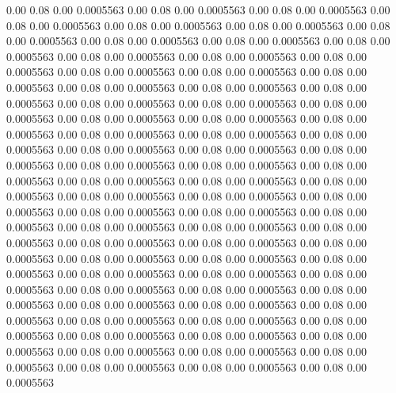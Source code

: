    0.00    0.08    0.00   0.0005563
   0.00    0.08    0.00   0.0005563
   0.00    0.08    0.00   0.0005563
   0.00    0.08    0.00   0.0005563
   0.00    0.08    0.00   0.0005563
   0.00    0.08    0.00   0.0005563
   0.00    0.08    0.00   0.0005563
   0.00    0.08    0.00   0.0005563
   0.00    0.08    0.00   0.0005563
   0.00    0.08    0.00   0.0005563
   0.00    0.08    0.00   0.0005563
   0.00    0.08    0.00   0.0005563
   0.00    0.08    0.00   0.0005563
   0.00    0.08    0.00   0.0005563
   0.00    0.08    0.00   0.0005563
   0.00    0.08    0.00   0.0005563
   0.00    0.08    0.00   0.0005563
   0.00    0.08    0.00   0.0005563
   0.00    0.08    0.00   0.0005563
   0.00    0.08    0.00   0.0005563
   0.00    0.08    0.00   0.0005563
   0.00    0.08    0.00   0.0005563
   0.00    0.08    0.00   0.0005563
   0.00    0.08    0.00   0.0005563
   0.00    0.08    0.00   0.0005563
   0.00    0.08    0.00   0.0005563
   0.00    0.08    0.00   0.0005563
   0.00    0.08    0.00   0.0005563
   0.00    0.08    0.00   0.0005563
   0.00    0.08    0.00   0.0005563
   0.00    0.08    0.00   0.0005563
   0.00    0.08    0.00   0.0005563
   0.00    0.08    0.00   0.0005563
   0.00    0.08    0.00   0.0005563
   0.00    0.08    0.00   0.0005563
   0.00    0.08    0.00   0.0005563
   0.00    0.08    0.00   0.0005563
   0.00    0.08    0.00   0.0005563
   0.00    0.08    0.00   0.0005563
   0.00    0.08    0.00   0.0005563
   0.00    0.08    0.00   0.0005563
   0.00    0.08    0.00   0.0005563
   0.00    0.08    0.00   0.0005563
   0.00    0.08    0.00   0.0005563
   0.00    0.08    0.00   0.0005563
   0.00    0.08    0.00   0.0005563
   0.00    0.08    0.00   0.0005563
   0.00    0.08    0.00   0.0005563
   0.00    0.08    0.00   0.0005563
   0.00    0.08    0.00   0.0005563
   0.00    0.08    0.00   0.0005563
   0.00    0.08    0.00   0.0005563
   0.00    0.08    0.00   0.0005563
   0.00    0.08    0.00   0.0005563
   0.00    0.08    0.00   0.0005563
   0.00    0.08    0.00   0.0005563
   0.00    0.08    0.00   0.0005563
   0.00    0.08    0.00   0.0005563
   0.00    0.08    0.00   0.0005563
   0.00    0.08    0.00   0.0005563
   0.00    0.08    0.00   0.0005563
   0.00    0.08    0.00   0.0005563
   0.00    0.08    0.00   0.0005563
   0.00    0.08    0.00   0.0005563
   0.00    0.08    0.00   0.0005563
   0.00    0.08    0.00   0.0005563
   0.00    0.08    0.00   0.0005563
   0.00    0.08    0.00   0.0005563
   0.00    0.08    0.00   0.0005563
   0.00    0.08    0.00   0.0005563
   0.00    0.08    0.00   0.0005563
   0.00    0.08    0.00   0.0005563
   0.00    0.08    0.00   0.0005563
